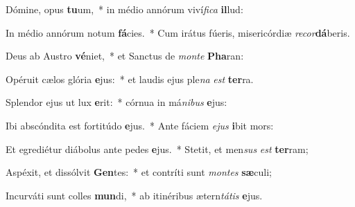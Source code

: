 \item Dómine, opus \textbf{tu}um,~* in médio annórum viví\textit{fi}\textit{ca} \textbf{il}lud:
\item In médio annórum notum \textbf{fá}cies.~* Cum irátus fúeris, misericórdiæ \textit{re}\textit{cor}\textbf{dá}beris.
\item Deus ab Austro \textbf{vé}niet,~* et Sanctus de \textit{mon}\textit{te} \textbf{Pha}ran:
\item Opéruit cælos glória \textbf{e}jus:~* et laudis ejus ple\textit{na} \textit{est} \textbf{ter}ra.
\item Splendor ejus ut lux \textbf{e}rit:~* córnua in má\textit{ni}\textit{bus} \textbf{e}jus:
\item Ibi abscóndita est fortitúdo \textbf{e}jus.~* Ante fáciem \textit{e}\textit{jus} \textbf{i}bit mors:
\item Et egrediétur diábolus ante pedes \textbf{e}jus.~* Stetit, et men\textit{sus} \textit{est} \textbf{ter}ram;
\item Aspéxit, et dissólvit \textbf{Gen}tes:~* et contríti sunt \textit{mon}\textit{tes} \textbf{sæ}culi;
\item Incurváti sunt colles \textbf{mun}di,~* ab itinéribus ætern\textit{tá}\textit{tis} \textbf{e}jus.
